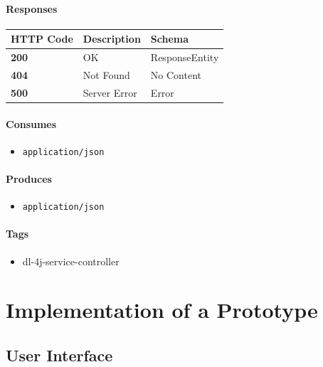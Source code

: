 \subsubsection{Responses}\label{responses-14}

\begin{longtable}[]{@{}lll@{}}
\toprule
HTTP Code & Description & Schema\tabularnewline
\midrule
\endhead
\textbf{200} & OK & ResponseEntity\tabularnewline
\textbf{404} & Not Found & No Content\tabularnewline
\textbf{500} & Server Error & Error\tabularnewline
\bottomrule
\end{longtable}

\subsubsection{Consumes}\label{consumes-7}

\begin{itemize}
\tightlist
\item
  \texttt{application/json}
\end{itemize}

\subsubsection{Produces}\label{produces-14}

\begin{itemize}
\tightlist
\item
  \texttt{application/json}
\end{itemize}

\subsubsection{Tags}\label{tags-14}

\begin{itemize}
\tightlist
\item
  dl-4j-service-controller
\end{itemize}

\chapter{Implementation of a
Prototype}\label{implementation-of-a-prototype}

\section{User Interface}\label{user-interface}

